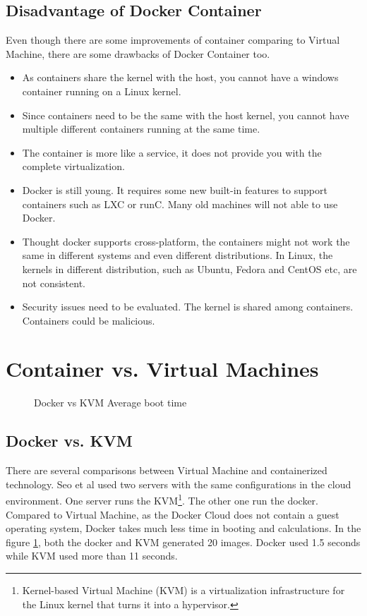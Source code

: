 \documentclass{sig-alternate}
\begin{document}
\subsection{Disadvantage of Docker Container}
Even though there are some improvements of container comparing to Virtual Machine, there are some drawbacks of Docker Container too. 
\begin{itemize}
\item As containers share the kernel with the host, you cannot have a windows container running on a Linux kernel.
\item Since containers need to be the same with the host kernel, you cannot have multiple different containers running at the same time. 
\item The container is more like a service, it does not provide you with the complete virtualization.
\item Docker is still young. It requires some new built-in features to support containers such as LXC or runC. Many old machines will not able to use Docker.
\item Thought docker supports cross-platform, the containers might not work the same in different systems and even different distributions. In Linux, the kernels in different distribution, such as Ubuntu, Fedora and CentOS etc, are not consistent.
\item Security issues need to be evaluated. The kernel is shared among containers. Containers could be malicious. 
\end{itemize}

\section{Container vs. Virtual Machines}

\begin{figure}[htb]
\centering
{}
\caption{Docker vs KVM Average boot time\cite{vdcp:seo}}
\label{fig:docker_kvm}
\vskip -6pt
\end{figure}

\subsection{Docker vs. KVM}

There are several comparisons between Virtual Machine and containerized technology. Seo et al\cite{vdcp:seo} used two servers with the same configurations in the cloud environment. One server runs the KVM\footnote{Kernel-based Virtual Machine (KVM) is a virtualization infrastructure for the Linux kernel that turns it into a hypervisor.}. The other one run the docker. Compared to Virtual Machine, as the Docker Cloud does not contain a guest operating system, Docker takes much less time in booting and calculations. In the figure \ref{fig:docker_kvm}, both the docker and KVM generated 20 images. Docker used 1.5 seconds while KVM used more than 11 seconds. 
\end{document}
